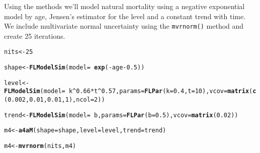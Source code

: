 \documentclass[a4paper,english,10pt]{article}\usepackage[]{graphicx}\usepackage[]{color}
\makeatletter
\newcommand{\hlnum}[1]{\textcolor[rgb]{0.686,0.059,0.569}{#1}}%
\newcommand{\hlopt}[1]{\textcolor[rgb]{0,0,0}{#1}}%
\newcommand{\hlstd}[1]{\textcolor[rgb]{0.345,0.345,0.345}{#1}}%
\newcommand{\hlkwb}[1]{\textcolor[rgb]{0.69,0.353,0.396}{#1}}%
\newcommand{\hlkwc}[1]{\textcolor[rgb]{0.333,0.667,0.333}{#1}}%
\newcommand{\hlkwd}[1]{\textcolor[rgb]{0.737,0.353,0.396}{\textbf{#1}}}%
\newenvironment{kframe}{%
 \def\at@end@of@kframe{}%
 \ifinner\ifhmode%
  \def\at@end@of@kframe{\end{minipage}}%
  \begin{minipage}{\columnwidth}%
 \fi\fi%
 \def\FrameCommand##1{\hskip\@totalleftmargin \hskip-\fboxsep
 \colorbox{shadecolor}{##1}\hskip-\fboxsep
     \hskip-\linewidth \hskip-\@totalleftmargin \hskip\columnwidth}%
 \MakeFramed {\advance\hsize-\width
   \@totalleftmargin\z@ \linewidth\hsize
   \@setminipage}}%
 {\par\unskip\endMakeFramed%
 \at@end@of@kframe}
\newenvironment{knitrout}{}{} %
\newcommand{\code}[1]{{\texttt{#1}}}
\makeatother
\begin{document}
Using the  methods we'll model natural mortality using a negative exponential model by age, Jensen's estimator for the level and a constant trend with time. We include multivariate normal uncertainty using the \code{mvrnorm()} method and create 25 iterations. 

\begin{knitrout}
\color{fgcolor}\begin{kframe}
\begin{alltt}
\hlstd{nits} \hlkwb{<-} \hlnum{25}

\hlstd{shape} \hlkwb{<-} \hlkwd{FLModelSim}\hlstd{(}\hlkwc{model}\hlstd{=}\hlopt{~}\hlkwd{exp}\hlstd{(}\hlopt{-}\hlstd{age}\hlopt{-}\hlnum{0.5}\hlstd{))}
\end{alltt}


{\ttfamily\noindent\bfseries{}}\begin{alltt}
\hlstd{level} \hlkwb{<-} \hlkwd{FLModelSim}\hlstd{(}\hlkwc{model}\hlstd{=}\hlopt{~}\hlstd{k}\hlopt{^}\hlnum{0.66}\hlopt{*}\hlstd{t}\hlopt{^}\hlnum{0.57}\hlstd{,} \hlkwc{params} \hlstd{=} \hlkwd{FLPar}\hlstd{(}\hlkwc{k}\hlstd{=}\hlnum{0.4}\hlstd{,} \hlkwc{t}\hlstd{=}\hlnum{10}\hlstd{),} \hlkwc{vcov}\hlstd{=}\hlkwd{matrix}\hlstd{(}\hlkwd{c}\hlstd{(}\hlnum{0.002}\hlstd{,} \hlnum{0.01}\hlstd{,}\hlnum{0.01}\hlstd{,} \hlnum{1}\hlstd{),} \hlkwc{ncol}\hlstd{=}\hlnum{2}\hlstd{))}
\end{alltt}


{\ttfamily\noindent\bfseries{}}\begin{alltt}
\hlstd{trend} \hlkwb{<-} \hlkwd{FLModelSim}\hlstd{(}\hlkwc{model}\hlstd{=}\hlopt{~}\hlstd{b,} \hlkwc{params}\hlstd{=}\hlkwd{FLPar}\hlstd{(}\hlkwc{b}\hlstd{=}\hlnum{0.5}\hlstd{),} \hlkwc{vcov}\hlstd{=}\hlkwd{matrix}\hlstd{(}\hlnum{0.02}\hlstd{))}
\end{alltt}


{\ttfamily\noindent\bfseries{}}\begin{alltt}
\hlstd{m4} \hlkwb{<-} \hlkwd{a4aM}\hlstd{(}\hlkwc{shape}\hlstd{=shape,} \hlkwc{level}\hlstd{=level,} \hlkwc{trend}\hlstd{=trend)}
\end{alltt}


{\ttfamily\noindent\bfseries{}}\begin{alltt}
\hlstd{m4} \hlkwb{<-} \hlkwd{mvrnorm}\hlstd{(nits, m4)}
\end{alltt}



\end{kframe}
\end{knitrout}
\end{document}
